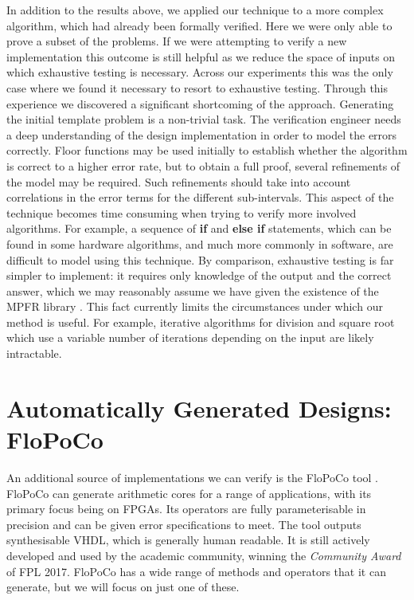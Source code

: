 \documentclass{fac}
\begin{document}
In addition to the results above, we applied our technique to a more complex algorithm, which had already been formally verified. Here we were only able to prove a subset of the problems. If we were attempting to verify a new implementation this outcome is still helpful as we reduce the space of inputs on which exhaustive testing is necessary. Across our experiments this was the only case where we found it necessary to resort to exhaustive testing. Through this experience we discovered a significant shortcoming of the approach. Generating the initial template problem is a non-trivial task. The verification engineer needs a deep understanding of the design implementation in order to model the errors correctly. Floor functions may be used initially to establish whether the algorithm is correct to a higher error rate, but to obtain a full proof, several refinements of the model may be required. Such refinements should take into account correlations in the error terms for the different sub-intervals. This aspect of the technique becomes time consuming when trying to verify more involved algorithms. For example, a sequence of \textbf{if} and \textbf{else if} statements, which can be found in some hardware algorithms, and much more commonly in software, are difficult to model using this technique. By comparison, exhaustive testing is far simpler to implement: it requires only knowledge of the output and the correct answer, which we may reasonably assume we have given the existence of the MPFR library \cite{fousse2007mpfr}. This fact currently limits the circumstances under which our method is useful. For example, iterative algorithms for division and square root which use a variable number of iterations depending on the input are likely intractable. 


\section{Automatically Generated Designs: FloPoCo}
\label{flopoco}
An additional source of implementations we can verify is the FloPoCo tool \cite{DinechinPasca2011-DaT}. FloPoCo can generate arithmetic cores for a range of applications, with its primary focus being on FPGAs. Its operators are fully parameterisable in precision and can be given error specifications to meet. The tool outputs synthesisable VHDL, which is generally human readable. It is still actively developed and used by the academic community, winning the \textit{Community Award} of FPL 2017. FloPoCo has a wide range of methods and operators that it can generate, but we will focus on just one of these.
\end{document}
